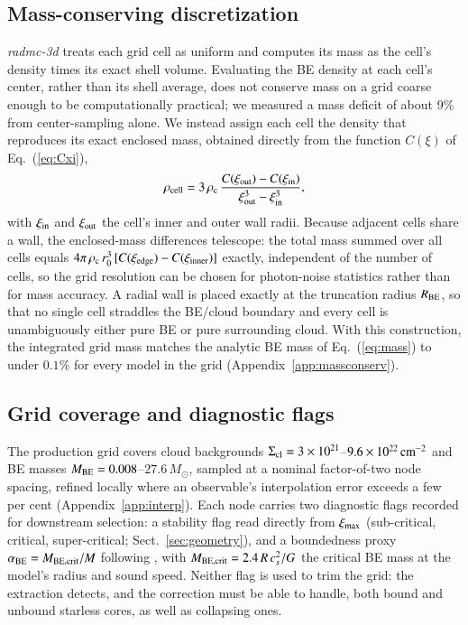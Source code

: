 \documentclass{aa}
\newcommand{\msun}{M_{\odot}}
\newcommand{\Scloud}{\Sigma_{\rm cl}}
\newcommand{\ximax}{\xi_{\rm max}}
\newcommand{\rhoc}{\rho_{\rm c}}
\newcommand{\rzero}{r_{0}}
\newcommand{\Rbe}{R_{\rm BE}}
\newcommand{\Mbe}{M_{\rm BE}}
\begin{document}
\subsection{Mass-conserving discretization}
\label{sec:massconserv}

\emph{radmc-3d} treats each grid cell as uniform and computes its mass as the
cell's density times its exact shell volume. Evaluating the BE density at
each cell's center, rather than its shell average, does not conserve mass
on a grid coarse enough to be computationally practical; we measured a
mass deficit of about 9\% from center-sampling alone. We instead assign
each cell the density that reproduces its exact enclosed mass, obtained
directly from the function $C(\xi)$ of Eq.~(\ref{eq:Cxi}),
\begin{equation}
  \rho_{\rm cell} = 3\,\rhoc\,
    \frac{C(\xi_{\rm out}) - C(\xi_{\rm in})}
         {\xi_{\rm out}^3 - \xi_{\rm in}^3},
  \label{eq:cellrho}
\end{equation}
with $\xi_{\rm in}$ and $\xi_{\rm out}$ the cell's inner and outer
wall radii. Because adjacent cells share a wall, the enclosed-mass
differences telescope: the total mass summed over all cells equals
$4\pi\,\rhoc\,\rzero^3\,[C(\xi_{\rm edge}) - C(\xi_{\rm inner})]$
exactly, independent of the number of cells, so the grid resolution can be
chosen for photon-noise statistics rather than for mass accuracy. A radial
wall is placed exactly at the truncation radius $\Rbe$, so that no single
cell straddles the BE/cloud boundary and every cell is unambiguously either
pure BE or pure surrounding cloud. With this construction, the integrated
grid mass matches the analytic BE mass of Eq.~(\ref{eq:mass}) to under
$0.1\%$ for every model in the grid (Appendix~\ref{app:massconserv}).

\subsection{Grid coverage and diagnostic flags}
\label{sec:gridcoverage}

The production grid covers cloud backgrounds
$\Scloud=3\times10^{21}$--$9.6\times10^{22}\,{\rm cm^{-2}}$ and BE masses
$\Mbe=0.008$--$27.6\,\msun$, sampled at a nominal factor-of-two node
spacing, refined locally where an observable's interpolation error exceeds
a few per cent (Appendix~\ref{app:interp}). Each node carries two
diagnostic flags recorded for downstream selection: a stability flag read
directly from $\ximax$ (sub-critical, critical, super-critical;
Sect.~\ref{sec:geometry}), and a boundedness proxy
$\alpha_{\rm BE}=M_{\rm BE,crit}/M$ following \citet{Konyves+2015}, with
$M_{\rm BE,crit}=2.4\,R\,c_s^2/G$ the critical BE mass at the model's
radius and sound speed. Neither flag is used to trim the grid: the
extraction detects, and the correction must be able to handle, both bound
and unbound starless cores, as well as collapsing ones.
\end{document}

